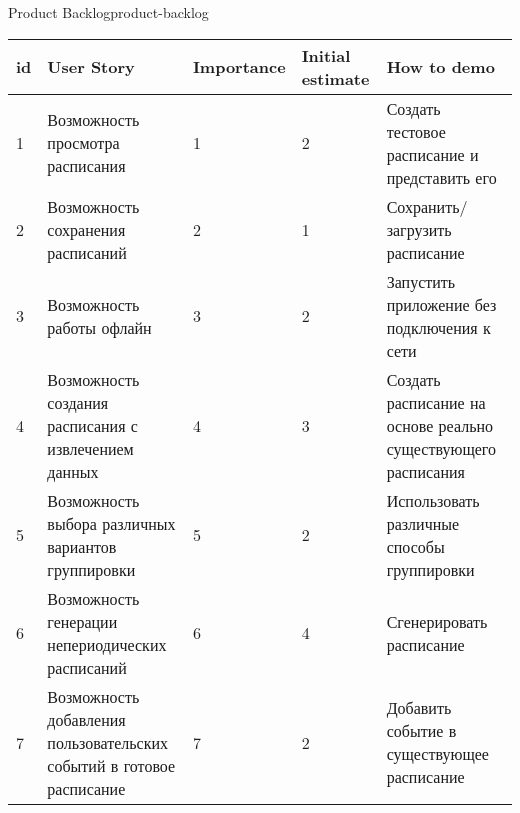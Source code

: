 \begin{tbl}{Product Backlog}{product-backlog}
  \begin{tabularx}{\textwidth}{| p{0.5cm} | p{4.5cm} | p{2cm} | p{1.5cm} | X |}
  \hline id
  & User Story
  & Importance
  & Initial estimate
  & How to demo \\
  \hline 1
  & Возможность просмотра расписания
  & 1
  & 2
  & Создать тестовое расписание и представить его \\
  \hline 2 
  & Возможность сохранения расписаний
  & 2
  & 1
  & Сохранить/загрузить расписание \\
  \hline 3
  & Возможность  работы офлайн
  & 3
  & 2
  & Запустить приложение без подключения к сети \\
  \hline 4
  & Возможность создания расписания с извлечением данных
  & 4
  & 3
  & Создать расписание на основе реально существующего расписания \\
  \hline 5
  & Возможность выбора различных вариантов группировки
  & 5
  & 2
  & Использовать различные способы группировки \\
  \hline 6
  & Возможность генерации непериодических расписаний
  & 6
  & 4
  & Сгенерировать расписание \\
  \hline 7
  & Возможность добавления пользовательских событий в готовое расписание
  & 7
  & 2
  & Добавить событие в существующее расписание \\
  \hline
  \end{tabularx}
\end{tbl}

\clearpage